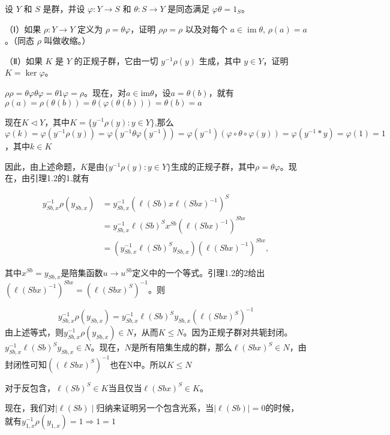 \documentclass[UTF8]{article}
\begin{document}
	\begin{framed}
		设 \( Y \) 和 \( S \) 是群，并设 \(\varphi : Y \rightarrow S\) 和 \(\theta : S \rightarrow Y\) 是同态满足 \(\varphi \theta = 1_S\)。
		
		（Ⅰ）如果 \(\rho : Y \rightarrow Y\) 定义为 \(\rho = \theta \varphi\)，证明 \(\rho \rho = \rho\) 以及对每个 \(a \in \operatorname{im}\theta\), \(\rho(a) = a\)。（同态 \(\rho\) 叫做收缩。）
		
		（Ⅱ）如果 \(K\) 是 \(Y\) 的正规子群，它由一切 \(y^{-1} \rho(y)\) 生成，其中 \(y \in Y\)，证明 \(K = \ker\varphi\)。
		
		$\rho\rho = \theta\varphi\theta\varphi = \theta 1 \varphi = \rho$。现在，对$a\in \text{im}\theta$，设$a = \theta(b)$，就有$\rho(a) = \rho(\theta(b)) = \theta(\varphi(\theta(b))) = \theta(b) = a$
		
		现在$K\lhd Y$，其中$K = \{y^{-1}\rho(y):y\in Y\}$,那么$\varphi(k) = \varphi(y^{-1}\rho(y)) = \varphi(y^{-1} \theta\varphi(y^{-1})) = \varphi(y^{-1}) (\varphi\circ \theta\circ\varphi(y)) = \varphi(y^{-1} * y) = \varphi(1) = 1$，其中$k\in K$
		
		
	\end{framed}
	因此，由上述命题，$K$是由$\{y^{-1}\rho(y):y\in Y\}$生成的正规子群，其中$\rho = \theta\varphi$。现在，由引理1.2的1.就有
	
	$$
\begin{aligned}
	y_{Sb,x}^{-1}\rho(y_{Sb,x}) &= y_{Sb,x}^{-1}\left(\ell(Sb)x\ell(Sbx)^{-1}\right)^S \\
	&= y_{Sb,x}^{-1}\ell(Sb)^S x^{Sb}\left(\ell(Sbx)^{-1}\right)^{Sbx} \\
	&= \left( y_{Sb,x}^{-1}\ell(Sb)^Sy_{Sb,x}\right)\left(\ell(Sbx)^{-1}\right)^{Sbx},
\end{aligned}
	$$
	
	其中$x^{Sb} = y_{Sb,x}$是陪集函数$u\to u^{Sb}$定义中的一个等式。引理1.2的2给出$(\ell(Sbx)^{-1})^{Sbx} = (\ell(Sbx)^S)^{-1}$。则

	$$
	y_{Sb,x}^{-1}\rho(y_{Sb,x}) = y^{-1}_{Sb,x}\ell(Sb)^S y_{Sb,x}(\ell(Sbx)^S)^{-1}
	$$
	由上述等式，则$y^{-1}_{Sb,x}\rho(y_{Sb,x}) \in N$，从而$K\leq N$。因为正规子群对共轭封闭。$ y^{-1}_{Sb,x}\ell(Sb)^S y_{Sb,x}\in N$。现在，$N$是所有陪集生成的群，那么$\ell(Sbx)^S \in N$，由封闭性可知$((\ell{Sbx})^S)^{-1}$也在N中。所以$K \leq N$
	
	
	对于反包含，$\ell(Sb)^S\in K$当且仅当$\ell(Sbx)^S\in K$。
	
	现在，我们对$\mid \ell(Sb)\mid $归纳来证明另一个包含光系，当$\mid \ell(Sb)\mid =0 $的时候，就有$y^{-1}_{1,x}\rho(y_{1,x}) = 1\Rightarrow 1 = 1$
	
\end{document}
